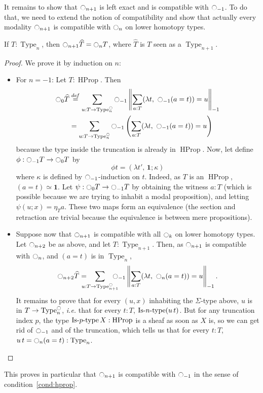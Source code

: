 \documentclass[notfinal]{jfrarticle}
\DeclareMathOperator{\Type}{Type}
\DeclareMathOperator{\HProp}{HProp}
\newcommand \defeq {\overset{de\hspace{-0.2ex}f}{=}}
\def\mymathhyphen{{\hbox{-}}}
\newcommand{\IsType}[1]
{\mathop{\mathrm{Is\mymathhyphen}#1\mathrm{\mymathhyphen type}} }
\newcommand{\modal}{\ensuremath{\ocircle}}
\newcommand \one {\mathbf{1}}
\newcommand{\ie}{\emph{i.e.}}
\begin{document}
It remains to show that $\modal_{n+1}$ is left exact and is compatible
with $\modal_{-1}$. To do that, we need to extend the notion of
compatibility and show that actually every modality $\modal_{n+1}$ is
compatible with $\modal_n$ on lower homotopy types.
\begin{prop} \label{prop:compatibility}
  If $T:\Type_n$, then $\modal_{n+1} \widehat T = \modal_n T$, where $\widehat T$ is $T$ seen as a
  $\Type_{n+1}$.
\end{prop}
\begin{proof}
  We prove it by induction on $n$:
  \begin{itemize}
  \item For $n=-1$: Let $T:\HProp$. Then
    \begin{align*}
      \modal_{0} \widehat T &\defeq \sum_{u:T \to \Type_n^\modal} \modal_{-1}\left\| \sum_{a:T} 
      (\lambda t,~\modal_{-1} (a=t)) = u\right\|_{-1} \\
      &= \sum_{u:T \to \Type_n^\modal} \modal_{-1}\left( \sum_{a:T} 
      (\lambda t,~\modal_{-1} (a=t)) = u\right)
    \end{align*}
    because the type inside the truncation is already in $\HProp$.
    Now, let define $\phi : \modal_{-1} T \to \modal_0T$ by
    \[\phi t = (\lambda t',\, \one
      ;\kappa)\]%
    where $\kappa$ is defined by $\modal_{-1}$-induction on
    $t$. Indeed, as $T$ is an $\HProp$, $(a=t) \simeq \one$. 
    Let $\psi : \modal_0T\to \modal_{-1} T$ by obtaining the
    witness $a:T$ (which is possible because we are trying to inhabit
    a modal proposition), and letting $\psi (u;x) = \eta_T a$.
    These two maps form an equivalence (the section and retraction are
    trivial because the equivalence is between mere propositions).
  \item Suppose now that $\modal_{n+1}$ is compatible with all $\modal_k$ on
    lower homotopy types. Let $\modal_{n+2}$ be as above, and let
    $T:\Type_{n+1}$. Then, as $\modal_{n+1}$ is compatible with $\modal_{n}$, and
    $(a=t)$ is in $\Type_n$,
    \[
      \modal_{n+2} \widehat T= \hspace{-1em} \sum_{u:T \to
        \Type_{n+1}^\modal} 
      \hspace{-1em} \modal_{-1}\left\| \sum_{a:T} 
        (\lambda t,~\modal_{n} (a=t)) = u\right\|_{-1}.
    \]%
    It remains to prove that for every $(u,x)$ inhabiting the
    $\Sigma$-type above, $u$ is in $T\to\Type_n^\modal$, \ie{} that for
    every $t:T$, $\IsType n (u\, t)$.  But for any truncation index
    $p$,
    the type $\IsType p X:\HProp$ is a sheaf as soon as $X$ is, so we can get rid
    of $\modal_{-1}$ and of the truncation, which tells us that for
    every 
    $t:T$, $u\, t = \modal_n(a=t) : \Type_n$. 
  \end{itemize}
\end{proof}
This proves in particular that $\modal_{n+1}$ is compatible with
$\modal_{-1}$ in the sense of condition~\ref{cond:hprop}.
\end{document}

